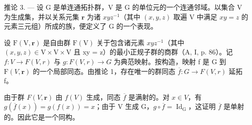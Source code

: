 推论 3. --- 设 G 是单连通拓扑群，V 是 G 的单位元的一个连通邻域。以集合 V 为生成集，并以关系元集 \(\mathbf{r}\) 为诸 \(xyz^{-1}\)（其中 \((x,y,z)\) 取遍 V 中满足 \(xy = z\) 的元素三元组）所成的族，便定义了 G 的一个表现。

设 \(\mathrm{F}(\mathrm{V}, \mathbf{r})\) 是自由群 \(\mathrm{F}(\mathrm{V})\) 关于包含诸元素 \(xyz^{-1}\)（其中 \((x, y, z) \in \mathrm{V} \times \mathrm{V} \times \mathrm{V}\) 且 xy = z）的最小正规子群的商群（A, I, p. 86）。记 \(f: V \to F(V, r)\) 与 \(g: F(V, r) \to G\) 为典范映射。按构造，映射 f 是 G 到 \(\mathrm{F}(V, \mathbf{r})\) 的一个局部同态。由推论 1，存在唯一的群同态 \(\overline{f}: G \to F(V, r)\) 延拓 f。

由于群 \(F(V, \mathbf{r})\) 由 \(f(V)\) 生成，同态 \(\overline{f}\) 是满射的。对 \(x \in V\)，有 \(g(\overline{f}(x)) = g(f(x)) = x\)；由于 V 生成 G，\(g \circ \overline{f} = \operatorname{Id}_{\operatorname{G}}\)，这证明 \(\overline{f}\) 是单射的。因此它是一个同构。
